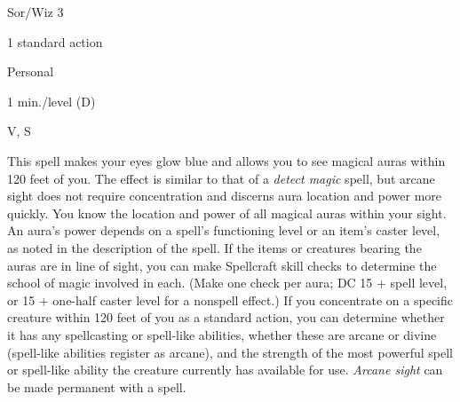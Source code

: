 
\begin{description*}
\item[Level:] Sor/Wiz 3
\item[Casting Time:] 1 standard action
\item[Range:] Personal
\item[Duration:] 1 min./level (D)
\item[Components:] V, S
\end{description*}

This spell makes your eyes glow blue and allows you to see magical auras within
120 feet of you. The effect is similar to that of a \textit{detect magic} spell,
but arcane sight does not require concentration and discerns aura location
and power more quickly.
You know the location and power of all magical auras within your sight. An aura's
power depends on a spell's functioning level or an item's caster level, as noted
in the description of the  spell. If the items or creatures
bearing the auras are in line of sight, you can make Spellcraft skill checks to
determine the school of magic involved in each. (Make one check per aura; DC 15
+ spell level, or 15 + one-half caster level for a nonspell effect.)
If you concentrate on a specific creature within 120 feet of you as a standard
action, you can determine whether it has any spellcasting or spell-like abilities,
whether these are arcane or divine (spell-like abilities register as arcane), and
the strength of the most powerful spell or spell-like ability the creature currently
has available for use.
\textit{Arcane sight} can be made permanent with a  spell.